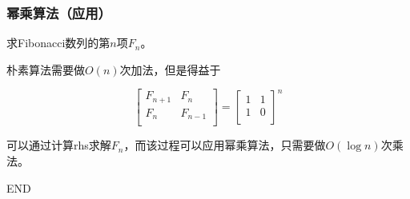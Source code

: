 \documentclass{ctexbeamer}
\begin{document}
    \begin{frame}
        \frametitle{幂乘算法（应用）}

        求Fibonacci数列的第$n$项$F_n$。

        朴素算法需要做$O(n)$次加法，但是得益于

        $$
        \begin{bmatrix}
            F_{n+1} & F_{n} \\
            F_{n} & F_{n-1} \\
        \end{bmatrix}
        =
        \begin{bmatrix}
            1 & 1 \\
            1 & 0 \\
        \end{bmatrix} ^ n
        $$

        可以通过计算rhs求解$F_n$，而该过程可以应用幂乘算法，只需要做$O(\log n)$次乘法。

    \end{frame}



    \begin{frame}
        END
    \end{frame}
    
\end{document}
